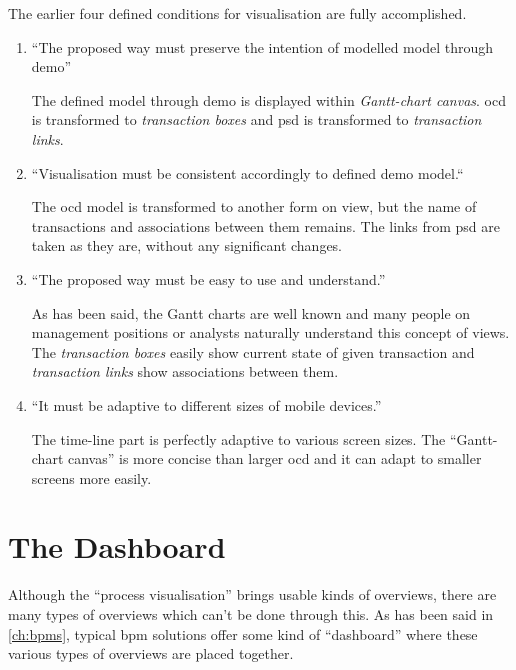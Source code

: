 The earlier four defined conditions for visualisation are fully accomplished.

\begin{enumerate}[i]
    \item \begin{graytext}
    ``The proposed way must preserve the intention of modelled model through \gls{demo}''\end{graytext}
    
    The defined model through \gls{demo} is displayed within \textit{Gantt-chart canvas}. \gls{ocd} is transformed to \textit{transaction boxes} and \gls{psd} is transformed to \textit{transaction links}.
    \item \begin{graytext}``Visualisation must be consistent accordingly to defined \gls{demo} model.`` \end{graytext}
    
    The \gls{ocd} model is transformed to another form on view, but the name of transactions and associations between them remains. The links from \gls{psd} are taken as they are, without any significant changes.
    \item \begin{graytext}``The proposed way must be easy to use and understand.''\end{graytext}
    
    As has been said, the Gantt charts are well known and many people on management positions or analysts naturally understand this concept of views. The \textit{transaction boxes} easily  show current state of given transaction and \textit{transaction links} show associations between them.    
    \item \begin{graytext}``It must be adaptive to different sizes of mobile devices.''\end{graytext}
    
    The time-line part is perfectly adaptive to various screen sizes. The ``Gantt-chart canvas'' is more concise than larger \gls{ocd} and it can adapt to smaller screens more easily.
\end{enumerate}

\section{The Dashboard}
Although the ``process visualisation'' brings usable kinds of overviews, there are many types of overviews which can't be done through this. As has been said in \cref{ch:bpms}, typical \gls{bpm} solutions offer some kind of ``dashboard'' where these various types of overviews are placed together. 

